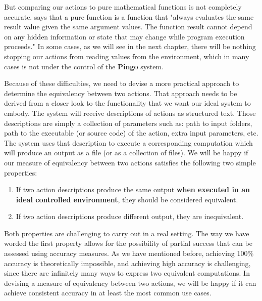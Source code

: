 But comparing our actions to pure mathematical functions is not completely accurate.  \cite{wiki:pure_function} says that a pure function is a function that "always evaluates the same result value given the same argument values.  The function result cannot depend on any hidden information or state that may change while program execution proceeds." In some cases, as we will see in the next chapter, there will be nothing stopping our actions from reading values from the environment, which in many cases is not under the control of the \textbf{Pingo} system.

Because of these difficulties, we need to devise a more practical approach to determine the equivalency between two actions.  That approach needs to be derived from a closer look to the functionality that we want our ideal system to embody.  The system will receive descriptions of actions as structured text.  Those descriptions are simply a collection of parameters such as: path to input folders, path to the executable (or source code) of the action, extra input parameters, etc.  The system uses that description to execute a corresponding computation which will produce an output as a file (or as a collection of files). We will be happy if our measure of equivalency between two actions satisfies the following two simple properties:

\begin{enumerate}
\item If two action descriptions produce the same output \textbf{when executed in an ideal controlled environment}, they should be considered equivalent.
\item If two action descriptions produce different output, they are inequivalent.
\end{enumerate}

Both properties are challenging to carry out in a real setting. The way we have worded the first property allows for the possibility of partial success that can be assessed using accuracy measures.  As we have mentioned before, achieving 100\% accuracy is theoretically impossible, and achieving high accuracy is challenging, since there are infinitely many ways to express two equivalent computations.  In devising a measure of equivalency between two actions, we will be happy if it can achieve consistent accuracy in at least the most common use cases.

